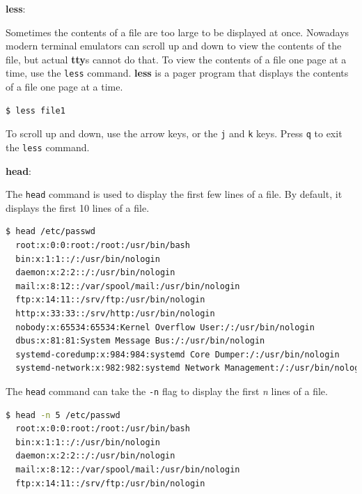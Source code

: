 \textbf{less}:

Sometimes the contents of a file are too large to be displayed at once.
Nowadays modern terminal emulators can scroll up and down to view the contents of the file,
but actual \textbf{tty}s cannot do that.
To view the contents of a file one page at a time, use the \texttt{less} command.
\textbf{less} is a pager program that displays the contents of a file one page at a time.

\begin{lstlisting}[language=bash]
  $ less file1
\end{lstlisting}

To scroll up and down, use the arrow keys, or the \texttt{j} and \texttt{k} keys.
Press \texttt{q} to exit the \texttt{less} command.

\textbf{head}:

The \texttt{head} command is used to display the first few lines of a file.
By default, it displays the first 10 lines of a file.

\begin{lstlisting}[language=bash]
  $ head /etc/passwd
  root:x:0:0:root:/root:/usr/bin/bash
  bin:x:1:1::/:/usr/bin/nologin
  daemon:x:2:2::/:/usr/bin/nologin
  mail:x:8:12::/var/spool/mail:/usr/bin/nologin
  ftp:x:14:11::/srv/ftp:/usr/bin/nologin
  http:x:33:33::/srv/http:/usr/bin/nologin
  nobody:x:65534:65534:Kernel Overflow User:/:/usr/bin/nologin
  dbus:x:81:81:System Message Bus:/:/usr/bin/nologin
  systemd-coredump:x:984:984:systemd Core Dumper:/:/usr/bin/nologin
  systemd-network:x:982:982:systemd Network Management:/:/usr/bin/nologin
\end{lstlisting}

The \texttt{head} command can take the \texttt{-n} flag to display the first \textit{n} lines of a file.

\begin{lstlisting}[language=bash]
  $ head -n 5 /etc/passwd
  root:x:0:0:root:/root:/usr/bin/bash
  bin:x:1:1::/:/usr/bin/nologin
  daemon:x:2:2::/:/usr/bin/nologin
  mail:x:8:12::/var/spool/mail:/usr/bin/nologin
  ftp:x:14:11::/srv/ftp:/usr/bin/nologin
\end{lstlisting}

